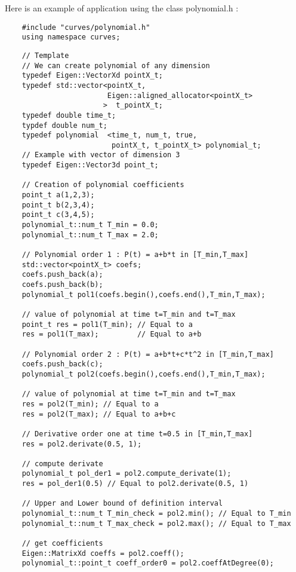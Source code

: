 \documentclass{article}
\begin{document}
    Here is an example of application using the class polynomial.h :
    \begin{lstlisting}
    #include "curves/polynomial.h"
    using namespace curves;
    \end{lstlisting}
    \begin{lstlisting}
    // Template
    // We can create polynomial of any dimension
    typedef Eigen::VectorXd pointX_t;
    typedef std::vector<pointX_t,
                        Eigen::aligned_allocator<pointX_t>
                       >  t_pointX_t;
    typedef double time_t;
    typdef double num_t;
    typedef polynomial  <time_t, num_t, true,
                         pointX_t, t_pointX_t> polynomial_t;
    // Example with vector of dimension 3
    typedef Eigen::Vector3d point_t;

    // Creation of polynomial coefficients
    point_t a(1,2,3);
    point_t b(2,3,4);
    point_t c(3,4,5);
    polynomial_t::num_t T_min = 0.0;
    polynomial_t::num_t T_max = 2.0;

    // Polynomial order 1 : P(t) = a+b*t in [T_min,T_max]
    std::vector<pointX_t> coefs;
    coefs.push_back(a);
    coefs.push_back(b);
    polynomial_t pol1(coefs.begin(),coefs.end(),T_min,T_max);

    // value of polynomial at time t=T_min and t=T_max
    point_t res = pol1(T_min); // Equal to a
    res = pol1(T_max);         // Equal to a+b

    // Polynomial order 2 : P(t) = a+b*t+c*t^2 in [T_min,T_max]
    coefs.push_back(c);
    polynomial_t pol2(coefs.begin(),coefs.end(),T_min,T_max);

    // value of polynomial at time t=T_min and t=T_max
    res = pol2(T_min); // Equal to a
    res = pol2(T_max); // Equal to a+b+c

    // Derivative order one at time t=0.5 in [T_min,T_max]
    res = pol2.derivate(0.5, 1);

    // compute derivate
    polynomial_t pol_der1 = pol2.compute_derivate(1);
    res = pol_der1(0.5) // Equal to pol2.derivate(0.5, 1)

    // Upper and Lower bound of definition interval
    polynomial_t::num_t T_min_check = pol2.min(); // Equal to T_min
    polynomial_t::num_t T_max_check = pol2.max(); // Equal to T_max

    // get coefficients
    Eigen::MatrixXd coeffs = pol2.coeff();
    polynomial_t::point_t coeff_order0 = pol2.coeffAtDegree(0);


\end{lstlisting}
\end{document}
